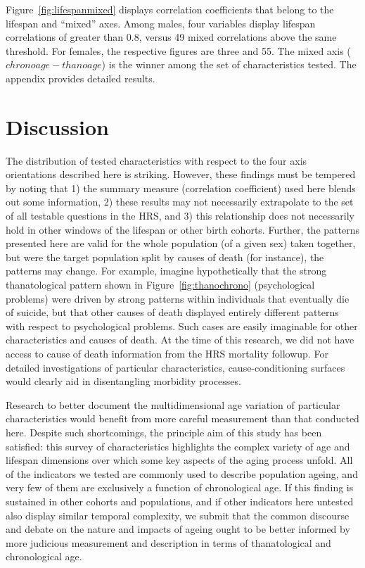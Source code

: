 \documentclass[11pt,oneside]{article} %
\begin{document}
\begin{figure}[!h]
{\begin{subfigure}{.7\textwidth}
	\end{subfigure}
	}
	
\end{figure}

Figure~\ref{fig:lifespanmixed} displays correlation coefficients
that belong to the lifespan and ``mixed'' axes. Among males, four variables
display lifespan correlations of greater than 0.8, versus 49 mixed correlations above
the same threshold. For females, the respective figures are three and 55. The
mixed axis ($chrono age - thano age$) is the winner among the set of
characteristics tested. The appendix provides detailed results. 

\section*{Discussion}
The distribution of tested characteristics with respect to the
four axis orientations described here is striking. However, these findings
must be tempered by noting that 1) the summary measure (correlation coefficient)
used here blends out some information, 2) these results may
not necessarily extrapolate to the set of all testable questions in the HRS, and 3) this relationship does not necessarily hold in other windows of the lifespan or other birth cohorts. Further, the patterns
presented here are valid for the whole population (of a given sex) taken
together, but were the target population split by causes of death (for
instance), the patterns may change. For example, imagine hypothetically that the
strong thanatological pattern shown in Figure~\ref{fig:thanochrono}
(psychological problems) were driven by strong patterns within individuals that
eventually die of suicide, but that other causes of death displayed entirely different patterns with respect to
psychological problems. Such cases are easily imaginable for other
characteristics and causes of death. At the time of this research, we did not
have access to cause of death information from the HRS mortality followup. For
detailed investigations of particular characteristics, cause-conditioning
surfaces would clearly aid in disentangling morbidity processes.

Research to better document the multidimensional age variation of particular
characteristics would benefit from more careful measurement than that conducted
here.
Despite such shortcomings, the principle aim of this study has been satisfied:
this survey of characteristics highlights the complex variety of age and
lifespan dimensions over which some key aspects of the aging process unfold. All
of the indicators we tested are commonly used to describe population ageing, and
very few of them are exclusively a function of chronological age. If this
finding is sustained in other cohorts and populations, and if other indicators
here untested also display similar temporal complexity, we submit that the
common discourse and debate on the nature and impacts of ageing ought to be
better informed by more judicious measurement and description in terms of
thanatological and chronological age.
\end{document}
